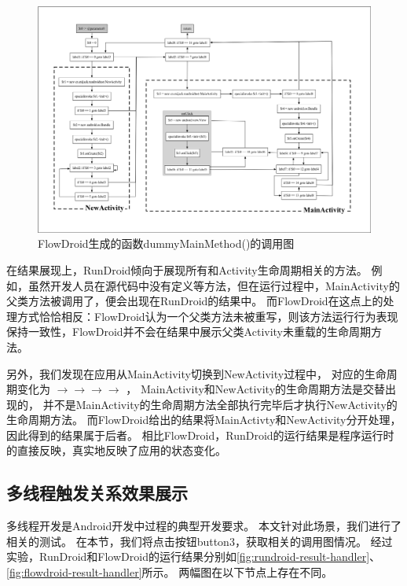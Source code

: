 \begin{figure}[ht]
	\centering
	\includegraphics[width=\textwidth]{./Figures/flowdroid-dummyMainMethod.png}
	\caption{FlowDroid生成的函数dummyMainMethod()的调用图}
	\label{fig:flowdroid-result-lifecycle}
\end{figure}

在结果展现上，RunDroid倾向于展现所有和Activity生命周期相关的方法。
例如，虽然开发人员在源代码中没有定义等方法，但在运行过程中，{MainActivity}的父类方法被调用了，便会出现在RunDroid的结果中。
而FlowDroid在这点上的处理方式恰恰相反：FlowDroid认为一个父类方法未被重写，则该方法运行行为表现保持一致性，FlowDroid并不会在结果中展示父类Activity未重载的生命周期方法。



另外，我们发现在应用从{MainActivity}切换到{NewActivity}过程中，
对应的生命周期变化为 $\to$$\to$$\to$$\to$ ，
{MainActivity}和{NewActivity}的生命周期方法是交替出现的，
并不是{MainActivity}的生命周期方法全部执行完毕后才执行{NewActivity}的生命周期方法。
而FlowDroid给出的结果将{MainActivty}和{NewActivity}分开处理，因此得到的结果属于后者。
相比FlowDroid，RunDroid的运行结果是程序运行时的直接反映，真实地反映了应用的状态变化。


\subsection{多线程触发关系效果展示}

多线程开发是Android开发中过程的典型开发要求。
本文针对此场景，我们进行了相关的测试。
在本节，我们将点击按钮button3，获取相关的调用图情况。
经过实验，RunDroid和FlowDroid的运行结果分别如\autoref{fig:rundroid-result-handler}、\autoref{fig:flowdroid-result-handler}所示。
两幅图在以下节点上存在不同。





